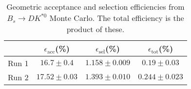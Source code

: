 \begin{table}
    \centering
    \begin{tabular}{cccc}
        \toprule
        & $\epsilon_\mathrm{acc}$(\%) &  $\epsilon_\mathrm{sel}$(\%) &  $\epsilon_\mathrm{tot}$(\%) \\
        \midrule
        Run 1 & $16.7 \pm 0.4$ & $1.158 \pm 0.009$ & $0.19 \pm 0.03$ \\
        Run 2 & $17.52 \pm 0.03$ & $1.393 \pm 0.010$ & $0.244 \pm 0.023$ \\
        \bottomrule
    \end{tabular}
    \caption{Geometric acceptance and selection efficiencies from  $B_s \to DK^{*0}$ Monte Carlo. The total efficiency is the  product of these.}
\label{tab:selection_efficiency_Bs}
\end{table}
